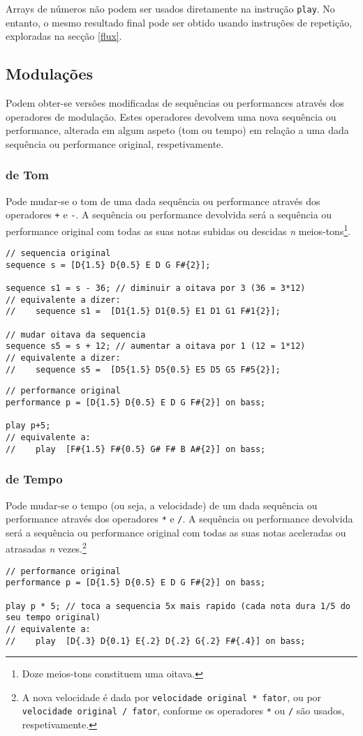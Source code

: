 \documentclass{article}
\begin{document}
Arrays de números não podem ser usados diretamente na instrução \texttt{play}. No entanto, o mesmo resultado final pode ser obtido usando instruções de repetição, exploradas na secção \ref{flux}.

\subsection{Modulações}
Podem obter-se versões modificadas de sequências ou performances através dos operadores de modulação. Estes operadores devolvem uma nova sequência ou performance, alterada em algum aspeto (tom ou tempo) em relação a uma dada sequência  ou performance original, respetivamente.
\subsubsection{de Tom}
Pode mudar-se o tom de uma dada sequência ou performance através dos operadores \texttt{+} e \texttt{-}. A sequência ou performance devolvida será a sequência ou performance original com todas as suas notas subidas ou descidas \textit{n} meios-tons\footnote{Doze meios-tons constituem uma oitava.}.
\begin{lstlisting} 
// sequencia original
sequence s = [D{1.5} D{0.5} E D G F#{2}];

sequence s1 = s - 36; // diminuir a oitava por 3 (36 = 3*12)
// equivalente a dizer:
//    sequence s1 =  [D1{1.5} D1{0.5} E1 D1 G1 F#1{2}];

// mudar oitava da sequencia
sequence s5 = s + 12; // aumentar a oitava por 1 (12 = 1*12)
// equivalente a dizer:
//    sequence s5 =  [D5{1.5} D5{0.5} E5 D5 G5 F#5{2}];
\end{lstlisting}
\begin{lstlisting} 
// performance original
performance p = [D{1.5} D{0.5} E D G F#{2}] on bass;

play p+5;
// equivalente a:
//    play  [F#{1.5} F#{0.5} G# F# B A#{2}] on bass;
\end{lstlisting}

\subsubsection{de Tempo}
Pode mudar-se o tempo (ou seja, a velocidade) de um dada sequência ou performance através dos operadores \texttt{*} e \texttt{/}. A sequência ou performance devolvida será a sequência ou performance original com todas as suas notas aceleradas ou atrasadas \textit{n} vezes.\footnote{A nova velocidade é dada por \texttt{velocidade original * fator}, ou por \texttt{velocidade original / fator}, conforme os operadores \texttt{*} ou \texttt{/} são usados, respetivamente.}
\begin{lstlisting} 
// performance original
performance p = [D{1.5} D{0.5} E D G F#{2}] on bass;

play p * 5; // toca a sequencia 5x mais rapido (cada nota dura 1/5 do seu tempo original)
// equivalente a:
//    play  [D{.3} D{0.1} E{.2} D{.2} G{.2} F#{.4}] on bass;
\end{lstlisting}
\end{document}
